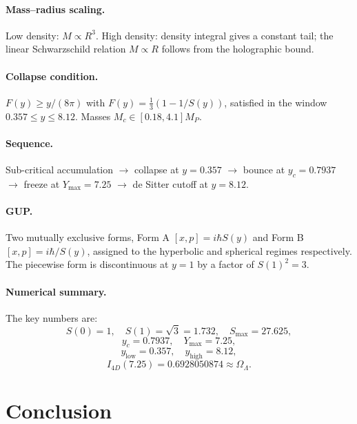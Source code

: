\documentclass[a4paper,7pt,oneside,openany]{book}
\begin{document}
\paragraph{Mass--radius scaling.}
Low density: $M\propto R^{3}$. High density: density integral 
gives a constant tail; the linear Schwarzschild relation 
$M\propto R$ follows from the holographic bound.

\paragraph{Collapse condition.}
$F(y)\geq y/(8\pi)$ with 
$F(y)=\frac{1}{3}(1-1/S(y))$, satisfied in the window 
$0.357\leq y\leq 8.12$. Masses $M_{c}\in[0.18,4.1]M_{P}$.

\paragraph{Sequence.}
Sub-critical accumulation $\to$ collapse at $y=0.357$ $\to$ 
bounce at $y_{c}=0.7937$ $\to$ freeze at $Y_{\max}=7.25$ $\to$ 
de Sitter cutoff at $y=8.12$.

\paragraph{GUP.}
Two mutually exclusive forms, Form A 
$[x,p]=i\hbar S(y)$ and Form B $[x,p]=i\hbar/S(y)$, assigned 
to the hyperbolic and spherical regimes respectively. The 
piecewise form is discontinuous at $y=1$ by a factor of 
$S(1)^{2}=3$.

\paragraph{Numerical summary.}
The key numbers are:
\begin{equation}
S(0)=1,\quad S(1)=\sqrt{3}=1.732,\quad S_{\max}=27.625,
\end{equation}
\begin{equation}
y_{c}=0.7937,\quad Y_{\max}=7.25,
\end{equation}
\begin{equation}
y_{\text{low}}=0.357,\quad y_{\text{high}}=8.12,
\end{equation}
\begin{equation}
I_{4D}(7.25)=0.6928050874\approx\Omega_{\Lambda}.
\end{equation}

\section{Conclusion}
\end{document}
